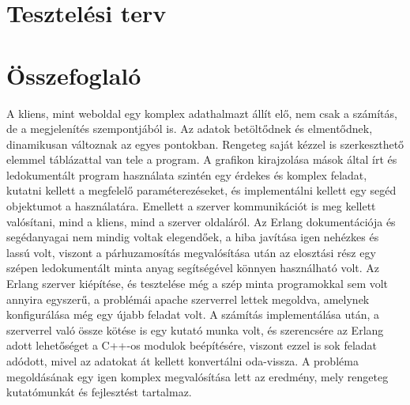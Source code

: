 \section{Tesztelési terv}


\newpage
\section{Összefoglaló}
	A kliens, mint weboldal egy komplex adathalmazt állít elő, nem csak a számítás, de a megjelenítés szempontjából is. Az adatok betöltődnek és elmentődnek, dinamikusan változnak az egyes pontokban. Rengeteg saját kézzel is szerkeszthető elemmel táblázattal van tele a program. A grafikon kirajzolása mások által írt és ledokumentált program használata szintén egy érdekes és komplex feladat, kutatni kellett a megfelelő paraméterezéseket, és implementálni kellett egy segéd objektumot a használatára.\newline
	Emellett a szerver kommunikációt is meg kellett valósítani, mind a kliens, mind a szerver oldaláról. \newline
	Az Erlang dokumentációja és segédanyagai nem mindig voltak elegendőek, a hiba javítása igen nehézkes és lassú volt, viszont a párhuzamosítás megvalósítása után az elosztási rész egy szépen ledokumentált minta anyag segítségével könnyen használható volt. \newline  
	Az Erlang szerver kiépítése, és tesztelése még a szép minta programokkal sem volt annyira egyszerű, a problémái apache szerverrel lettek megoldva, amelynek konfigurálása még egy újabb feladat volt. \newline
	A számítás implementálása után, a szerverrel való össze kötése is egy kutató munka volt, és szerencsére az Erlang adott lehetőséget a C++-os modulok beépítésére, viszont ezzel is sok feladat adódott, mivel az adatokat át kellett konvertálni oda-vissza.
	\newline
	A probléma megoldásának egy igen komplex megvalósítása lett az eredmény, mely rengeteg kutatómunkát és fejlesztést tartalmaz.